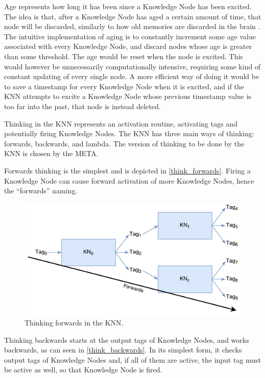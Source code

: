 \documentclass[titlepage,11pt]{article}
\begin{document}
Age represents how long it has been since a Knowledge Node has been excited. The idea is that, after a Knowledge Node has aged a certain amount of time, that node will be discarded, similarly to how old memories are discarded in the brain \cite{aging}. The intuitive implementation of aging is to constantly increment some age value associated with every Knowledge Node, and discard nodes whose age is greater than some threshold. The age would be reset when the node is excited. This would however be unnecessarily computationally intensive, requiring some kind of constant updating of every single node. A more efficient way of doing it would be to save a timestamp for every Knowledge Node when it is excited, and if the KNN attempts to excite a Knowledge Node whose previous timestamp value is too far into the past, that node is instead deleted.

Thinking in the KNN represents an activation routine, activating tags and potentially firing Knowledge Nodes. The KNN has three main ways of thinking: forwards, backwards, and lambda. The version of thinking to be done by the KNN is chosen by the META.

Forwards thinking is the simplest and is depicted in \autoref{think_forwards}. Firing a Knowledge Node can cause forward activation of more Knowledge Nodes, hence the ``forwards'' naming.

\begin{figure}[!htb]
	\includegraphics[width=\columnwidth]{figures/forwards_thinking.pdf}
	\caption{Thinking forwards in the KNN.}
	\label{think_forwards}
\end{figure}

Thinking backwards starts at the output tags of Knowledge Nodes, and works backwards, as can seen in \autoref{think_backwards}. In its simplest form, it checks output tags of Knowledge Nodes and, if all of them are active, the input tag must be active as well, so that Knowledge Node is fired.
\end{document}
